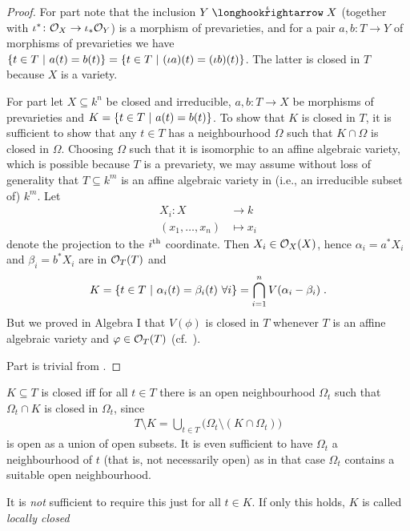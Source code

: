 \documentclass[a4paper,parskip=half,numbers=enddot, DIV=12]{scrreprt}
\begin{document}
\begin{proof}
		For part  note that the inclusion $Y\monomorphism[\iota] X$ (together with $\iota^*\colon \mathcal{O}_X\to\iota_*\mathcal{O}_Y$) is a morphism of prevarieties, and for a pair $a,b\colon T\to Y$ of morphisms of prevarieties we have $\left\{t\in T\ \middle|\  a(t) = b(t) \right\} = \left\{t \in T\ \middle|\ (\iota a)(t) = (\iota b)(t) \right\}$. The latter is closed in $T$ because $X$ is a variety.
	
        For part  let $X\subseteq k^n$ be closed and irreducible, $a,b\colon T\to X$ be morphisms of prevarieties and $K= \left\{t\in T\ \middle|\  a(t) = b(t)\right\}$. To show that $K$ is closed in $T$, it is sufficient to show that any $t\in T$ has a neighbourhood $\Omega$ such that $K\cap \Omega$ is closed in $\Omega$. Choosing $\Omega$ such that it is isomorphic to an affine algebraic variety, which is possible because $T$ is a prevariety, we may assume without loss of generality that $T\subseteq k^m$ is an affine algebraic variety in (i.e.,  an irreducible subset of) $k^m$. Let 
	        \begin{align*}
		    X_i\colon X&\longrightarrow k\\
		    (x_1,\ldots,x_n)&\longmapsto x_i
		\end{align*}
		denote the projection to the $i^{\text{th}}$ coordinate. Then $X_i\in\mathcal{O}_X(X)$, hence $\alpha_i = a^\ast X_i$ and $\beta_i = b^\ast X_i$ are in $\mathcal{O}_T(T)$ and 
		\begin{align}
		    K= \left\{ t\in T\ \middle|\  \alpha_i(t) = \beta_i(t)\ \forall i\right\} = \bigcap_{i=1}^n V(\alpha_i-\beta_i)\;.
		\end{align}
		But we proved in Algebra I that $V(\phi)$ is closed in $T$ whenever $T$ is an affine algebraic variety and $\varphi\in  \mathcal{O}_T(T)$ (cf.\ \cite[Proposition 2.2.1]{alg1}).
		
		Part  is trivial from .	
\end{proof}
\begin{rem}
    \begin{alphanumerate}
    \item {}
        $K\subseteq T$ is closed iff for all $t\in T$ there is an open neighbourhood $\Omega_t$ such that $\Omega_t\cap K$ is closed in $\Omega_t$, since 
        \begin{align*}
            T\setminus K = \bigcup_{t\in T} \big(\Omega_t\setminus (K\cap \Omega_t)\big)
        \end{align*}
        is open as a union of open subsets. It is even sufficient to have $\Omega_t$ a neighbourhood of $t$ (that is, not necessarily open) as in that case $\Omega_t$ contains a suitable open neighbourhood.
    \item
        It is \emph{not} sufficient to require this just for all $t\in K$. If only this holds, $K$ is called \emph{locally closed}
    \end{alphanumerate}
\end{rem}
\end{document}
